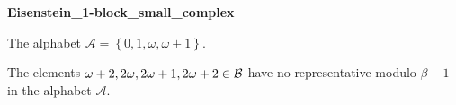 \begin{exmp}
\textbf{ Eisenstein\_1-block\_small\_complex }

\label{ex:Eisenstein1-blocksmallcomplex}

The alphabet $\mathcal{A} =\left\{0, 1, \omega, \omega + 1\right\}$.

The elements $ \omega + 2, 2\omega, 2\omega + 1, 2\omega + 2 \in\mathcal{B} $ have no representative  modulo $\beta-1$ in the alphabet $\mathcal{A}$.
\end{exmp}
